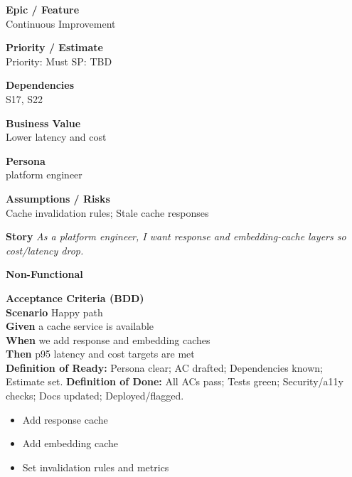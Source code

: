 \documentclass[11pt,a4paper]{article}
\newenvironment{StoryCard}[2][]{
  \begin{tcolorbox}[enhanced, breakable, sharp corners=all, colback=cardback, colframe=cardframe,
    title={#2}, fonttitle=\bfseries\large, boxrule=0.6pt, borderline west={2pt}{0pt}{accent}, #1]
}{
  \end{tcolorbox}
}
\newcommand{\badge}[1]{\pill{\footnotesize #1}}
\newcommand{\cb}{\(\square\)}
\newenvironment{TasksBox}[1][Tasks]{%
  \begin{tcolorbox}[enhanced,breakable,
    colback=cardback, colframe=cardframe, title={#1},
    borderline west={1.8pt}{0pt}{MidnightBlue},
    arc=2pt, boxrule=0.4pt,
    left=10pt,right=10pt,top=6pt,bottom=6pt,
    before skip=6pt, after skip=10pt
  ]
  \small
  \begin{itemize}[label=\cb, leftmargin=*, labelsep=0.6em, itemsep=4pt, topsep=2pt, parsep=0pt]
}{%
  \end{itemize}
  \end{tcolorbox}
}
\begin{document}
\begin{StoryCard}{S31 — Caching \& retrieval optimization}
\noindent\begin{minipage}[t]{0.49\textwidth}
\textbf{Epic / Feature}\\
Continuous Improvement

\medskip
\textbf{Priority / Estimate}\\
Priority: Must \quad SP: TBD

\medskip
\textbf{Dependencies}\\
S17, S22
\end{minipage}\hfill
\begin{minipage}[t]{0.49\textwidth}
\textbf{Business Value}\\
Lower latency and cost

\medskip
\textbf{Persona}\\
platform engineer

\medskip
\textbf{Assumptions / Risks}\\
Cache invalidation rules; Stale cache responses
\end{minipage}

\medskip
\textbf{Story} \emph{As a platform engineer, I want response and embedding-cache layers so cost/latency drop.}

\medskip
\textbf{Non-Functional}
\badge{Performance}\ \badge{Cost}

\medskip
\textbf{Acceptance Criteria (BDD)}\\
\textbf{Scenario} Happy path\\
\textbf{Given} a cache service is available\\
\textbf{When} we add response and embedding caches\\
\textbf{Then} p95 latency and cost targets are met\\

\medskip
\footnotesize \textbf{Definition of Ready:} Persona clear; AC drafted; Dependencies known; Estimate set.\quad
\textbf{Definition of Done:} All ACs pass; Tests green; Security/a11y checks; Docs updated; Deployed/flagged.
\end{StoryCard}

\begin{TasksBox}[Tasks]
  \item Add response cache
  \item Add embedding cache
  \item Set invalidation rules and metrics
\end{TasksBox}
\clearpage
\end{document}
